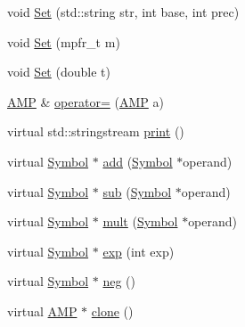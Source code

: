 \begin{DoxyCompactItemize}
\item 
void \hyperlink{class_a_m_p_a1a3f15f4cd90c4f97fcfe2f4fbb2e4e5}{Set} (std\+::string str, int base, int prec)
\item 
void \hyperlink{class_a_m_p_a3c0a25d70c600791f4ad22b11e462101}{Set} (mpfr\+\_\+t m)
\item 
void \hyperlink{class_a_m_p_a4d7472e47c0b5458c00fe30dff4d91d4}{Set} (double t)
\item 
\hyperlink{class_a_m_p}{A\+M\+P} \& \hyperlink{class_a_m_p_a5bbdda51e9627a6e4ec3171fce34c1b3}{operator=} (\hyperlink{class_a_m_p}{A\+M\+P} a)
\item 
virtual std\+::stringstream \hyperlink{class_a_m_p_a0d97f7941390b745d4a8c5099f8530c1}{print} ()
\item 
virtual \hyperlink{class_symbol}{Symbol} $\ast$ \hyperlink{class_a_m_p_a13330b73b85994d48e091ba35d37f5da}{add} (\hyperlink{class_symbol}{Symbol} $\ast$operand)
\item 
virtual \hyperlink{class_symbol}{Symbol} $\ast$ \hyperlink{class_a_m_p_aa22f858fe19e8d00dea47ee9a6c26040}{sub} (\hyperlink{class_symbol}{Symbol} $\ast$operand)
\item 
virtual \hyperlink{class_symbol}{Symbol} $\ast$ \hyperlink{class_a_m_p_ab9c9e14b427261284a980f936ce64095}{mult} (\hyperlink{class_symbol}{Symbol} $\ast$operand)
\item 
virtual \hyperlink{class_symbol}{Symbol} $\ast$ \hyperlink{class_a_m_p_a0c3ed1aeaa0a0974f0ea3f7f92dbe080}{exp} (int exp)
\item 
virtual \hyperlink{class_symbol}{Symbol} $\ast$ \hyperlink{class_a_m_p_aacc63b07222e5a3e1d3008ffcf8564c2}{neg} ()
\item 
virtual \hyperlink{class_a_m_p}{A\+M\+P} $\ast$ \hyperlink{class_a_m_p_a7be3cf2bc62e7849d829412cd9e83875}{clone} ()
\end{DoxyCompactItemize}
